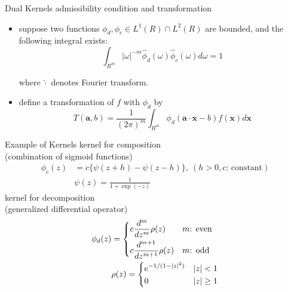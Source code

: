 \documentclass[fleqn,aspectratio=1610]{beamer}
\begin{document}
\begin{frame}[label={sec:orgdc1fcd5}]{Dual Kernels}
\alert{admissibility condition} and \alert{transformation}
\begin{itemize}
\item suppose two functions \(\phi_{d},\phi_{c}\in L^{1}(R)\cap
  L^{2}(R)\) are bounded, and the following integral exists:
\begin{equation}
  \int_{R^{m}}|\omega|^{-m}
  \hat\phi_{d}(\omega)\hat\phi_{c}(\omega)d\omega=1%
\end{equation}

where \(\hat\cdot\) denotes Fourier transform.
\item define a transformation of \(f\) with \(\phi_{d}\) by
\begin{equation}
  T(\boldsymbol{a},b)
  =\frac{1}{(2\pi)^{m}}
  \int_{R^{m}}\phi_{d}(\boldsymbol{a}\cdot\boldsymbol{x}-b)
  f(\boldsymbol{x})d\boldsymbol{x}
\end{equation}
\end{itemize}
\end{frame}

\begin{frame}[label={sec:orgdb5b70f}]{Example of Kernels}
\alert{kernel for composition}\\[0pt]
(combination of sigmoid functions)
\begin{align}
  \phi_{c}(z)
  &=c\{\psi(z+h)-\psi(z-h)\},\ (h>0,\text{\(c\): constant})\\
  &\psi(z)=\frac{1}{1+\exp(-z)}
\end{align}
\alert{kernel for decomposition}\\[0pt]
(generalized differential operator)
\begin{align}
  \phi_{d}(z)
  &=
    \begin{dcases}
      c\frac{d^{m}}{dz^{m}}\rho(z)& \text{\(m\): even}\\
      c\frac{d^{m+1}}{dz^{m+1}}\rho(z)& \text{\(m\): odd}
    \end{dcases}\\
  &\rho(z)=
    \begin{dcases}
      e^{-1/(1-|z|^2)}& |z|<1\\
      0 & |z|\geq1
    \end{dcases}
\end{align}
\end{frame}
\end{document}
